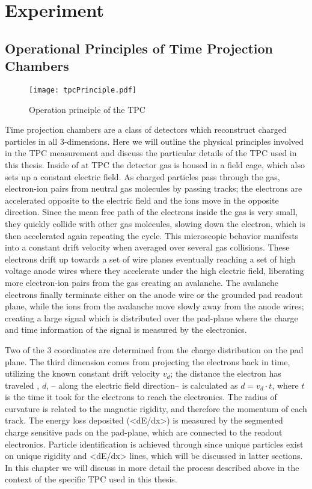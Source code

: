 \chapter{Experiment}

\section{Operational Principles of Time Projection Chambers}


\begin{figure}
\texttt{[image: tpcPrinciple.pdf]}
\label{fig:tpcPrinciple}
\caption{Operation principle of the TPC}
\end{figure}
Time projection chambers are a class of detectors which reconstruct charged particles in all 3-dimensions. Here we will outline the physical principles involved in the TPC measurement and discuss the particular details of the TPC used in this thesis. Inside of at TPC the detector gas is housed in a field cage, which also sets up a constant electric field. As charged particles pass through the gas, electron-ion pairs from neutral gas molecules by passing tracks; the electrons are accelerated opposite to the electric field and the ions move in the opposite direction. Since the mean free path of the electrons inside the gas is very small, they quickly collide with other gas molecules, slowing down the electron, which is then accelerated again repeating the cycle. This microscopic behavior manifests into a constant drift velocity when averaged over several gas collisions. These electrons drift up towards a set of wire planes eventually reaching a set of high voltage anode wires where they accelerate under the high electric field, liberating more electron-ion pairs from the gas creating an avalanche. The avalanche electrons finally terminate either on the anode wire or the grounded pad readout plane,  while the ions from the avalanche move slowly away from the anode wires; creating a large signal which is distributed over the pad-plane where the charge and time information of the signal is measured by the  electronics. 

Two of the 3 coordinates are determined from the charge distribution on the pad plane. The third dimension comes from projecting the electrons back in time, utilizing the known constant drift velocity $v_d$; the distance the electron has traveled , $d$, -- along the electric field direction-- is calculated as $d = v_d \cdot t$, where $t$ is the time it took for the electrons to reach the electronics. The radius of curvature is related to the magnetic rigidity, and therefore the momentum of each track. The energy loss  deposited (<dE/dx>) is measured by the segmented charge sensitive pads on the pad-plane, which are connected to the readout electronics. Particle identification is achieved through since unique particles exist on unique rigidity and <dE/dx>  lines, which will be discussed in latter sections. In this chapter we will discuss in more detail the process described above in the context of the specific TPC used in this thesis. 


